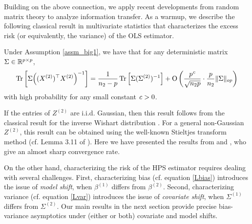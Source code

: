 



Building on the above connection, we apply recent developments from random matrix theory to analyze information transfer.
As a warmup, we describe the following classical result in multivariate statistics that characterizes the excess risk (or equivalently, the variance) of the OLS estimator.

\begin{lemma}\label{fact_tr}
	Under Assumption \ref{assm_big1}, we have that for any deterministic  matrix $\Sigma\in\mathbb{R}^{p\times p}$,
		\[ \bigtr{\Sigma \Big((X^{(2)})^\top X^{(2)} \Big)^{-1}  } %
		= \frac{1}{n_2 - p}\bigtr{\Sigma (\Sigma^{(2)})^{-1}} +  \OO\left( \frac{p^{\e}}{\sqrt{n_2 p}}\cdot \frac{p}{n_2}\|\Sigma\|_{op} \right) \]
		with high probability for any small constant ${\mathit{c}}>0$.
\end{lemma}

If the entries of $Z^{(2)}$ are i.i.d. Gaussian, then this result follows from the classical result for %
the inverse Wishart distribution \citet{anderson1958introduction}. For a general non-Gaussian $Z^{(2)}$, this result can be obtained using the well-known Stieltjes transform method (cf. Lemma 3.11 of \citet{bai2009spectral}). Here we have presented the results from \citet{isotropic} and \citet{DY}, who give an almost sharp convergence rate.

On the other hand, characterizing the risk of the HPS estimator requires dealing with several challenges.
First, characterizing bias (cf. equation \eqref{Lbias}) introduces the issue of \textit{model shift}, when $\beta^{(1)}$ differs from $\beta^{(2)}$.
Second, characterizing variance (cf. equation \eqref{Lvar}) introduces  the issue of \textit{covariate shift}, when $\Sigma^{(1)}$ differs from $\Sigma^{(2)}$.
Our main results in the next section provide precise bias-variance asymptotics under (either or both) covariate and model shifts.